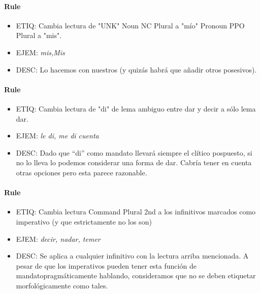 \documentclass[11pt]{report}
\begin{document}
\paragraph*{Rule}
\begin{itemize}
\item ETIQ: Cambia lectura de "UNK" Noun NC Plural a "mío" Pronoun PPO Plural a "mis".
\item EJEM: \emph{mis,Mis} 
\item DESC: Lo hacemos con nuestros (y quizás habrá que añadir otros posesivos).
\end{itemize}

\paragraph*{Rule}
\begin{itemize}
\item ETIQ: Cambia lectura de "di" de lema ambiguo entre dar y decir a sólo lema dar.
\item EJEM: \emph{le di, me di cuenta} 
\item DESC: Dado que ``di'' como mandato llevará siempre el clítico pospuesto, si no lo lleva lo podemos considerar una forma de dar. Cabría tener en cuenta otras opciones pero esta parece razonable.
\end{itemize}

\paragraph*{Rule}
\begin{itemize}
\item ETIQ: Cambia lectura Command Plural 2nd a los infinitivos marcados como imperativo (y que estrictamente no los son)
\item EJEM: \emph{decir, nadar, temer} 
\item DESC: Se aplica a cualquier infinitivo con la lectura arriba mencionada. A pesar de que los imperativos pueden tener esta función de mandatopragmáticamente hablando, consideramos que no se deben etiquetar morfológicamente como tales.
\end{itemize}
\end{document}

